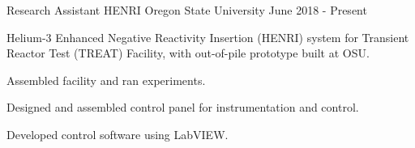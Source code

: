 \begin{cventries}
    \cventry
    {Research Assistant} %
    {HENRI} %
    {Oregon State University} %
    {June 2018 - Present} %
    {
      \begin{cvitems} %
        \item{Helium-3 Enhanced Negative Reactivity Insertion (HENRI) system for Transient Reactor Test (TREAT) Facility, with out-of-pile prototype built at OSU.}
        \item{Assembled facility and ran experiments.}
        \item{Designed and assembled control panel for instrumentation and control.}
        \item{Developed control software using LabVIEW.}
      \end{cvitems}
    }


\end{cventries}